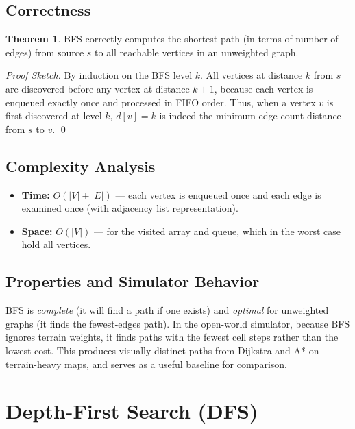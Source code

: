 \documentclass[12pt, a4paper, oneside]{report}
\theoremstyle{definition}
\newtheorem{theorem}{Theorem}[chapter]
\begin{document}
\subsection{Correctness}

\begin{theorem}
BFS correctly computes the shortest path (in terms of number of edges) from source $s$ to all reachable vertices in an unweighted graph.
\end{theorem}

\begin{proof}[Proof Sketch]
By induction on the BFS level $k$. All vertices at distance $k$ from $s$ are discovered before any vertex at distance $k+1$, because each vertex is enqueued exactly once and processed in FIFO order. Thus, when a vertex $v$ is first discovered at level $k$, $d[v] = k$ is indeed the minimum edge-count distance from $s$ to $v$. \qed
\end{proof}

\subsection{Complexity Analysis}

\begin{itemize}
    \item \textbf{Time:} $O(|V| + |E|)$ — each vertex is enqueued once and each edge is examined once (with adjacency list representation).
    \item \textbf{Space:} $O(|V|)$ — for the visited array and queue, which in the worst case hold all vertices.
\end{itemize}

\subsection{Properties and Simulator Behavior}

BFS is \emph{complete} (it will find a path if one exists) and \emph{optimal} for unweighted graphs (it finds the fewest-edges path). In the open-world simulator, because BFS ignores terrain weights, it finds paths with the fewest cell steps rather than the lowest cost. This produces visually distinct paths from Dijkstra and A* on terrain-heavy maps, and serves as a useful baseline for comparison.

\section{Depth-First Search (DFS)}
\end{document}
